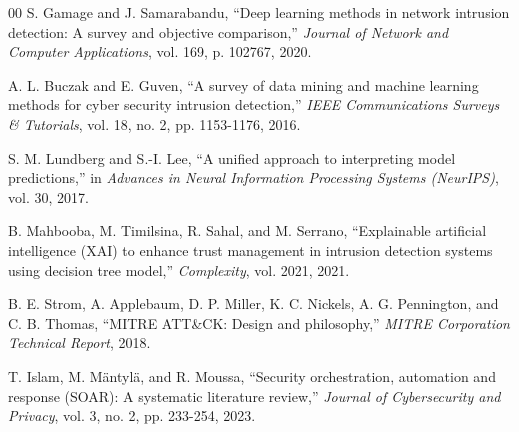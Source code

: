 \documentclass[conference]{IEEEtran}
\begin{document}
\begin{thebibliography}{00}
S. Gamage and J. Samarabandu, ``Deep learning methods in network intrusion detection: A survey and objective comparison,'' \textit{Journal of Network and Computer Applications}, vol. 169, p. 102767, 2020.

A. L. Buczak and E. Guven, ``A survey of data mining and machine learning methods for cyber security intrusion detection,'' \textit{IEEE Communications Surveys \& Tutorials}, vol. 18, no. 2, pp. 1153-1176, 2016.

S. M. Lundberg and S.-I. Lee, ``A unified approach to interpreting model predictions,'' in \textit{Advances in Neural Information Processing Systems (NeurIPS)}, vol. 30, 2017.

B. Mahbooba, M. Timilsina, R. Sahal, and M. Serrano, ``Explainable artificial intelligence (XAI) to enhance trust management in intrusion detection systems using decision tree model,'' \textit{Complexity}, vol. 2021, 2021.

B. E. Strom, A. Applebaum, D. P. Miller, K. C. Nickels, A. G. Pennington, and C. B. Thomas, ``MITRE ATT\&CK: Design and philosophy,'' \textit{MITRE Corporation Technical Report}, 2018.

T. Islam, M. Mäntylä, and R. Moussa, ``Security orchestration, automation and response (SOAR): A systematic literature review,'' \textit{Journal of Cybersecurity and Privacy}, vol. 3, no. 2, pp. 233-254, 2023.

\end{thebibliography}
\end{document}
